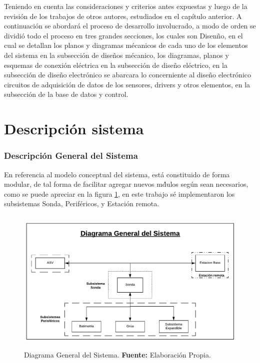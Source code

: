 Teniendo en cuenta las consideraciones y criterios antes expuestas y luego de la revisi\'on de los trabajos de otros autores, estudiados en el cap\'itulo anterior. A continuaci\'on se abordar\'a el proceso de desarrollo involucrado, a modo de orden se dividi\'o todo el proceso en tres grandes secciones, los cuales son Disen\~no, en el cual se detallan los planos y diagramas m\'ecanicos de cada uno de los elementos del sistema en la subsecci\'on de dise\~nos m\'ecanico, los diagramas, planos y esquemas de conexi\'on el\'ectrica en la subsecci\'on de dise\~no el\'ectrico, en la subsecci\'on de dise\~no electr\'onico se abarcara lo concerniente al diseño electr\'onico circuitos de adquisici\'on de datos de los sensores, drivers y otros elementos, en la subsecci\'on de la base de datos y control. 

\section{Descripci\'on  sistema }
\subsubsection[Descripción General del Sistema]{Descripción General del Sistema}
En referencia al modelo conceptual del sistema, está constituido de forma modular, de tal forma de facilitar agregar nuevos m\'dulos seg\'un sean necesarios, como se puede apreciar en la figura \ref{fig:DiagramaGeneral}, en este trabajo sé implementaron los subsistemas Sonda, Perif\'ericos, y Estación remota.  

\begin{figure}[H]
    \centering
    \includegraphics[width=150mm, height=70mm]{Imagenes/2021/img31.pdf}
    \caption[Diagrama General del Sistema]{Diagrama General del Sistema. \textbf{Fuente:} Elaboración Propia.}
    \label{fig:DiagramaGeneral}
\end{figure}

